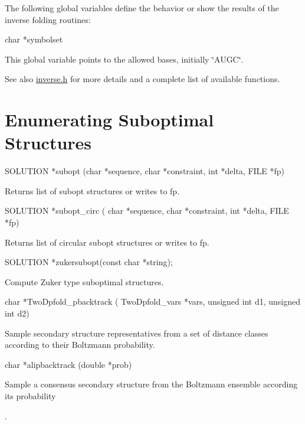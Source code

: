 The following global variables define the behavior or show the results of the inverse folding routines:

\begin{DoxyVerb}
char *symbolset
\end{DoxyVerb}
 This global variable points to the allowed bases, initially \char`\"{}AUGC\char`\"{}. 

\begin{DoxySeeAlso}{See also}
\hyperlink{inverse_8h}{inverse.h} for more details and a complete list of available functions.
\end{DoxySeeAlso}
\hypertarget{mp__fold_mp_Suboptimal_folding}{}\section{Enumerating Suboptimal Structures}\label{mp__fold_mp_Suboptimal_folding}
\begin{DoxyVerb}
SOLUTION *subopt (char *sequence,
                  char *constraint,
                  int *delta,
                  FILE *fp)
\end{DoxyVerb}
 Returns list of subopt structures or writes to fp. 

\begin{DoxyVerb}
SOLUTION *subopt_circ ( char *sequence,
                        char *constraint,
                        int *delta,
                        FILE *fp)
\end{DoxyVerb}
 Returns list of circular subopt structures or writes to fp. 

\begin{DoxyVerb}
SOLUTION  *zukersubopt(const char *string);
\end{DoxyVerb}
 Compute Zuker type suboptimal structures. 

\begin{DoxyVerb}
char  *TwoDpfold_pbacktrack ( TwoDpfold_vars *vars,
                              unsigned int d1,
                              unsigned int d2)
\end{DoxyVerb}
 Sample secondary structure representatives from a set of distance classes according to their Boltzmann probability. 

\begin{DoxyVerb}
char  *alipbacktrack (double *prob)
\end{DoxyVerb}
 Sample a consensus secondary structure from the Boltzmann ensemble according its probability\par
. 

